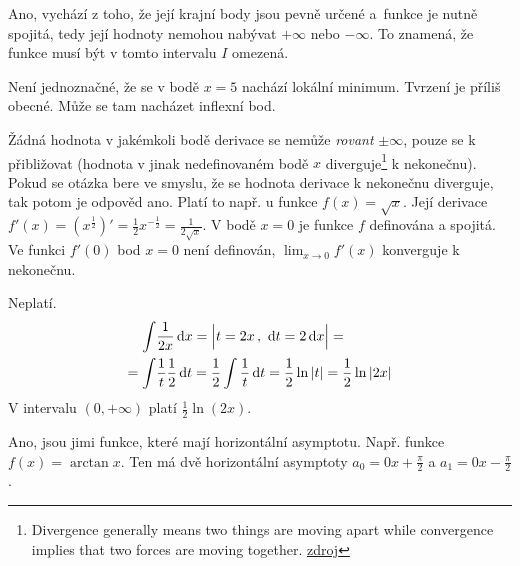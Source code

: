 
\begin{tcolorbox}[title=1. otázka]
    Ano, vychází z toho, že její krajní body jsou pevně určené 
    a~funkce je nutně spojitá, tedy její hodnoty nemohou 
    nabývat $+\infty$ nebo $-\infty$.
    To znamená, že funkce musí být v tomto intervalu $I$ omezená.
\end{tcolorbox}

\begin{tcolorbox}[title=2. otázka]
    Není jednoznačné, že se v bodě $x = 5$ nachází lokální minimum.
    Tvrzení je příliš obecné. Může se tam nacházet inflexní bod.
\end{tcolorbox}

\begin{tcolorbox}[title=3. otázka]
    Žádná hodnota v jakémkoli bodě derivace se nemůže \emph{rovant} $\pm \infty$, pouze se k přibližovat (hodnota v jinak nedefinovaném bodě $x$ diverguje\footnote{Divergence generally means two things are moving apart while convergence implies that two forces are moving together. \href{https://www.investopedia.com/ask/answers/121714/what-are-differences-between-divergence-and-convergence.asp}{zdroj} } k nekonečnu). Pokud se otázka bere ve smyslu, že se hodnota derivace k nekonečnu diverguje, tak potom je odpověd ano.
    Platí to např. u funkce $f(x) = \sqrt{x}$. Její derivace $f'(x) = (x^{\frac{1}{2}})' = \frac{1}{2}x^{-\frac{1}{2}} = \frac{1}{2\sqrt{x}}$. V bodě $x = 0$ je funkce $f$ definována a spojitá. Ve funkci $f'(0)$ bod $x = 0$ není definován, $\lim_{x \rightarrow 0} f'(x)$ konverguje k nekonečnu.
\end{tcolorbox}


\begin{tcolorbox}[title=4. otázka]
    Neplatí. 
    \begin{align}
        \int& \frac{1}{2x}\mathop{}\!\mathrm{d}{x} = \Big| 
        t = 2x \, , \,\, \mathop{}\!\mathrm{d}{t} = 2\mathop{}\!\mathrm{d}{x} \Big| = \\
        = \int& \frac{1}{t}\frac{1}{2}\mathop{}\!\mathrm{d}{t}
        = \frac{1}{2}\int \frac{1}{t}\mathop{}\!\mathrm{d}{t} = 
        \frac{1}{2}\ln{|t|} = \frac{1}{2}\ln{|2x|}
    \end{align}
    V intervalu $(0, +\infty)$ platí $\frac{1}{2}\ln{(2x)}$.
\end{tcolorbox}

\begin{tcolorbox}[title=5. otázka]
    Ano, jsou jimi funkce, které mají horizontální asymptotu. Např. funkce $f(x) = \arctan{x}$. Ten má dvě horizontální asymptoty $a_0 = 0x + \frac{\pi}{2}$ a $a_1 = 0x - \frac{\pi}{2}$.
\end{tcolorbox}

